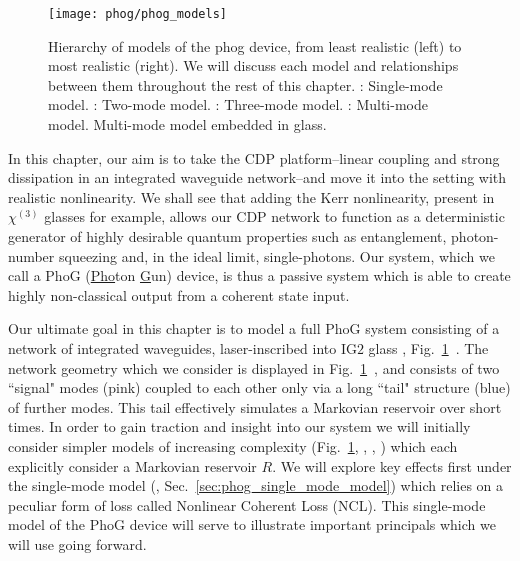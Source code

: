 \begin{figure}[htp]
\centering
\texttt{[image: phog/phog\_models]}
\caption{\label{fig:phog_models} Hierarchy of models of the phog device, from least realistic (left) to most realistic (right). We will discuss each model and relationships between them throughout the rest of this chapter. \MakeUppercase{}: Single-mode model. \MakeUppercase{}: Two-mode model. \MakeUppercase{}: Three-mode model. \MakeUppercase{}: Multi-mode model. \MakeUppercase{} Multi-mode model embedded in glass. }
\end{figure}

In this chapter, our aim is to take the CDP platform--linear coupling and strong dissipation in an integrated waveguide network--and move it into the setting with realistic nonlinearity. We shall see that adding the Kerr nonlinearity, present in $\chi^{\left(3\right)}$ glasses for example, allows our CDP network to function as a deterministic generator of highly desirable quantum properties such as entanglement, photon-number squeezing and, in the ideal limit, single-photons. Our system, which we call a PhoG (\underline{Pho}ton \underline{G}un) device, is thus a passive system which is able to create highly non-classical output from a coherent state input.


Our ultimate goal in this chapter is to model a full PhoG system consisting of a network of integrated waveguides, laser-inscribed into IG$2$ glass \cite{ig2}, Fig.~\ref{fig:phog_models}~\MakeUppercase{}. The network geometry which we consider is displayed in Fig.~\ref{fig:phog_models}~\MakeUppercase{}, and consists of two ``signal" modes (pink) coupled to each other only via a long ``tail" structure (blue) of further modes. This tail effectively simulates a Markovian reservoir over short times. In order to gain traction and insight into our system we will initially consider simpler models of increasing complexity (Fig.~\ref{fig:phog_models}, \MakeUppercase{}, \MakeUppercase{}, \MakeUppercase{}) which each explicitly consider a Markovian reservoir $R$. We will explore key effects first under the single-mode model (\MakeUppercase{}, Sec.~\ref{sec:phog_single_mode_model}) which relies on a peculiar form of loss called Nonlinear Coherent Loss (NCL). This single-mode model of the PhoG device will serve to illustrate important principals which we will use going forward. 

